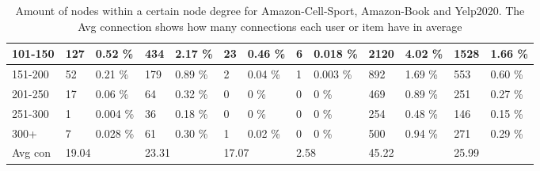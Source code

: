 \begin{table*}[]
\begin{tabular}{|l|l|l|l|l|l|l|l|l|l|l|l|l|}
        101-150 & 127                           & 0.52 \%                                & 434                              & 2.17 \%                    & 23                         & 0.46 \%                    & 6     & 0.018 \%     & 2120  & 4.02 \%  & 1528  & 1.66 \%  \\ \hline
        151-200 & 52                            & 0.21 \%                                & 179                              & 0.89 \%                    & 2                          & 0.04 \%                    & 1     & 0.003     \% & 892   & 1.69 \%  & 553   & 0.60 \%  \\ \hline
        201-250 & 17                            & 0.06 \%                                & 64                               & 0.32 \%                    & 0                          & 0    \%                    & 0     & 0     \%     & 469   & 0.89 \%  & 251   & 0.27 \%  \\ \hline
        251-300 & 1                             & 0.004 \%                               & 36                               & 0.18 \%                    & 0                          & 0    \%                    & 0     & 0     \%     & 254   & 0.48 \%  & 146   & 0.15 \%  \\ \hline
        300+    & 7                             & 0.028 \%                               & 61                               & 0.30 \%                    & 1                          & 0.02 \%                    & 0     & 0  \%        & 500   & 0.94 \%  & 271   & 0.29 \%  \\ \hline
        Avg con & \multicolumn{2}{l|}{19.04}    & \multicolumn{2}{l|}{23.31}             & \multicolumn{2}{l|}{17.07}       & \multicolumn{2}{l|}{2.58}  & \multicolumn{2}{l|}{45.22} & \multicolumn{2}{l|}{25.99}                                                              \\ \hline
    \end{tabular}
    \caption{Amount of nodes within a certain node degree for Amazon-Cell-Sport, Amazon-Book and Yelp2020. The Avg connection shows how many connections each user or item have in average}
    \label{tab:dataset-item-and-user-splits}
\end{table*}

